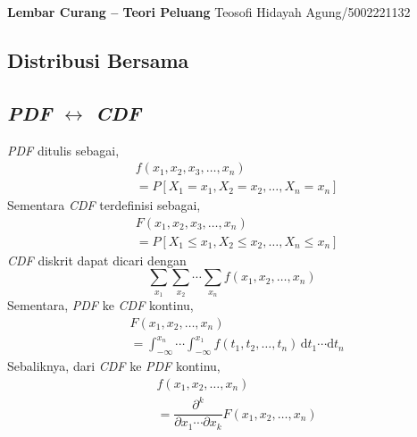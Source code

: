 \documentclass[extrafontsizes, 9pt]{memoir}
\begin{document}
	\begin{center}
		\textbf{{Lembar Curang -- Teori Peluang}} \hfill Teosofi Hidayah Agung/5002221132
	\end{center}
	
	\begin{multicols}{3}			
		\section*{\small Distribusi Bersama}
			\subsection*{\small \textsl{PDF} $\leftrightarrow$ \textsl{CDF}}
				\textsl{PDF} ditulis sebagai,
					\begin{align*}
						& f\left(x_{1}, x_{2}, x_{3}, \ldots, x_{n}\right)\\
						& = P\left[X_{1} = x_{1}, X_{2} = x_{2}, \ldots, X_{n} = x_{n}\right]
					\end{align*}
				Sementara \textsl{CDF} terdefinisi sebagai,
					\begin{align*}
						& F\left(x_{1}, x_{2}, x_{3}, \ldots, x_{n}\right)\\
						& = P\left[X_{1} \leq x_{1}, X_{2} \leq x_{2}, \ldots, X_{n} \leq x_{n}\right]
					\end{align*}
				\textsl{CDF} diskrit dapat dicari dengan
					\[
						\sum_{x_{1}}\sum_{x_{2}}\cdots\sum_{x_{n}}f\left(x_{1}, x_{2}, \ldots, x_{n}\right)
					\]					
				Sementara, \textsl{PDF} ke \textsl{CDF} kontinu,
					\begin{align*}
						& F\left(x_{1}, x_{2}, \ldots, x_{n}\right)\\
						& = \int_{-\infty}^{x_{n}}\cdots\int_{-\infty}^{x_{1}}f\left(t_{1}, t_{2}, \ldots, t_{n}\right)\,\mathrm{d}t_{1}\cdots\mathrm{d}t_{n}
					\end{align*}
				Sebaliknya, dari \textsl{CDF} ke \textsl{PDF} kontinu,
					\begin{align*}
						& f\left(x_{1}, x_{2}, \ldots, x_{n}\right)\\
						& = \dfrac{\partial^{k}}{\partial x_{1}\cdots \partial x_{k}}F\left(x_{1}, x_{2}, \ldots, x_{n}\right)
					\end{align*}
					

\end{multicols}
\end{document}
